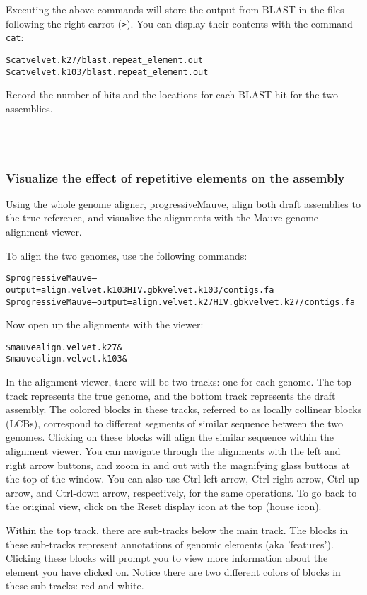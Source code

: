 \documentclass[11pt,a4paper]{scrartcl}
\newcommand{\oneline}{
~\\
~\\
\noindent
}
\begin{document}
\noindent
Executing the above commands will store the output from BLAST in the files
following the right carrot (\texttt{>}). You can display their contents with the command
\texttt{cat}: 

\begin{alltt}
    \$ cat velvet.k27/blast.repeat_element.out 
    \$ cat velvet.k103/blast.repeat_element.out
\end{alltt}
\noindent
Record the number of hits and the locations for each BLAST hit for the two assemblies.
\oneline


\subsubsection{Visualize the effect of repetitive elements on the assembly}
Using the whole genome aligner, progressiveMauve, align both draft assemblies
to the true reference, and visualize the alignments with the Mauve genome
alignment viewer.

\noindent
To align the two genomes, use the following commands:
\begin{alltt}
    \$ progressiveMauve --output=align.velvet.k103 HIV.gbk velvet.k103/contigs.fa
    \$ progressiveMauve --output=align.velvet.k27 HIV.gbk velvet.k27/contigs.fa
\end{alltt}

\noindent
Now open up the alignments with the viewer:

\begin{alltt}
    \$ mauve align.velvet.k27 &
    \$ mauve align.velvet.k103 &
\end{alltt}

\noindent
In the alignment viewer, there will be two tracks: one for each genome. The top
track represents the true genome, and the bottom track represents the draft
assembly. The colored blocks in these tracks, referred to as locally collinear
blocks (LCBs), correspond to different segments of similar sequence between the
two genomes. Clicking on these blocks will align the similar sequence within
the alignment viewer. You can navigate through the alignments with the left and
right arrow buttons, and zoom in and out with the magnifying glass buttons at
the top of the window. You can also use Ctrl-left arrow, Ctrl-right arrow,
Ctrl-up arrow, and Ctrl-down arrow, respectively, for the same operations. To
go back to the original view, click on the Reset display icon at the top (house
icon).

Within the top track, there are sub-tracks below the main track. The blocks in
these sub-tracks represent annotations of genomic elements (aka 'features').
Clicking these blocks will prompt you to view more information about the
element you have clicked on. Notice there are two different colors of blocks in
these sub-tracks: red and white. 
\end{document}
